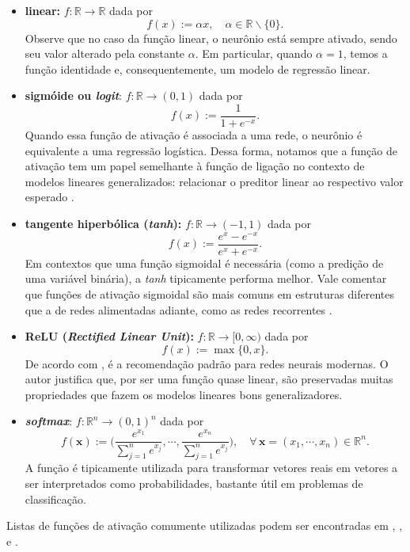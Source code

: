 \documentclass{automatextcc}
\newcommand{\R}{\mathds{R}}
\newcommand{\bs}[1]{\boldsymbol{#1}}
\begin{document}
\begin{itemize}
    \item \textbf{linear:} $f: \R \rightarrow \R$ dada por 
    \[f(x) := \alpha x, \quad \alpha \in \R\backslash\{0\}.\]
    Observe que no caso da função linear, o neurônio está sempre ativado, sendo seu valor alterado pela constante $\alpha$. Em particular, quando $\alpha=1$, temos a função identidade e, consequentemente, um modelo de regressão linear.
    \item \textbf{sigmóide ou \textit{logit}}: $f: \R \rightarrow (0,1)$ dada por 
    \[f(x) := \frac{1}{1 + e^{-x}}.\]
    Quando essa função de ativação é associada a uma rede, o neurônio é equivalente a uma regressão logística. Dessa forma, notamos que a função de ativação tem um papel semelhante à função de ligação no contexto de modelos lineares generalizados: relacionar o preditor linear ao respectivo valor esperado \citep{sarle1994,frei2020,mccullagh1989}.
    \item \textbf{tangente hiperbólica (\textit{tanh}):}  $f:\R \rightarrow (-1,1)$ dada por 
    \[f(x) := \frac{e^{x}-e^{-x}}{e^{x}+e^{-x}}.\]
    Em contextos que uma função sigmoidal é necessária (como a predição de uma variável binária), a \textit{tanh} tipicamente performa melhor. Vale comentar que funções de ativação sigmoidal são mais comuns em estruturas diferentes que a de redes alimentadas adiante, como as redes recorrentes \citep{goodfellow2016}.  
    \item \textbf{ReLU (\textit{Rectified Linear Unit}):} $f: \R \rightarrow [0,\infty)$ dada por 
    \[f(x) := \max\{0,x\}.\]
    De acordo com \citet{goodfellow2016}, é a recomendação padrão para redes neurais modernas. O autor justifica que, por ser uma função quase linear, são preservadas muitas propriedades que fazem os modelos lineares bons generalizadores. 
    \item \textbf{\textit{softmax}}: $f:\R^n\rightarrow (0,1)^n$ dada por 
    \[f(\bs x):=\bigg(\frac{e^{x_1}}{\sum_{j=1}^n e^{x_j}},\cdots, \frac{e^{x_n}}{\sum_{j=1}^n e^{x_j}}\bigg), \quad \forall\,\bs x=(x_1,\cdots,x_n)\in\R^n.\]
    {A função} é tipicamente utilizada para transformar vetores reais em vetores a ser interpretados como probabilidades, bastante útil em problemas de classificação.
\end{itemize}

Listas de funções de ativação comumente utilizadas podem ser encontradas em \citet{hastie2009}, \citet{hagan2014}, \citet{aggarwal2018} e \citet{dsa2022}.
\end{document}

